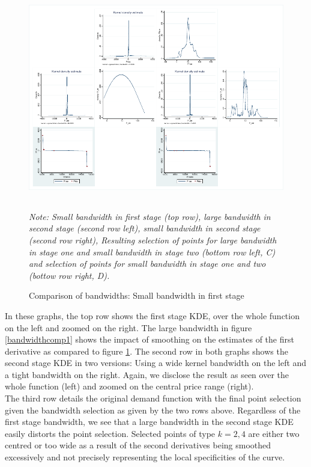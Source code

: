 \begin{subappendices}
\begin{figure}[!ht]
\begin{center}
\includegraphics[height=90mm]{figch2/comparison2.pdf} 
\caption{Comparison of bandwidths: Small bandwidth in first stage}
\label{bandwidthcomp2}
\end{center}
\emph{Note: Small bandwidth in first stage (top row), large bandwidth in second stage (second row left), small bandwidth in second stage (second row right), Resulting selection of points for large bandwidth in stage one and small bandwidth in stage two (bottom row left, C) and selection of points for small bandwidth in stage one and two (bottow row right, D).}
\end{figure}


In these graphs, the top row shows the first stage KDE, over the whole function on the left and zoomed on the right. The large bandwidth in figure \ref{bandwidthcomp1} shows the impact of smoothing on the estimates of the first derivative as compared to figure \ref{bandwidthcomp2}.
The second row in both graphs shows the second stage KDE in two versions: Using a wide kernel bandwidth on the left and a tight bandwidth on the right. Again, we disclose the result as seen over the whole function (left) and zoomed on the central price range (right).\\

The third row details the original demand function with the final point selection given the bandwidth selection as given by the two rows above. 
Regardless of the first stage bandwidth, we see that a large bandwidth in the second stage KDE easily distorts the point selection. Selected points of type $k=2,4$ are either two centred or too wide as a result of the second derivatives being smoothed excessively and not precisely representing the local specificities of the curve. \\


\end{subappendices}
